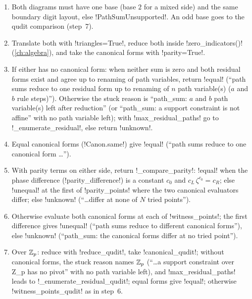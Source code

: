 \begin{algorithm}\label{alg:semantics-compare-pathsums}
\begin{enumerate}
\item Both diagrams must have one base (base $2$ for a mixed side) and the same boundary digit layout, else \py!PathSumUnsupported!. An odd base goes to the qudit comparison (step~7).
\item Translate both with \py!triangles=True!, reduce both inside \py!zero_indicators()! (\cref{ch:algebra}), and take the canonical forms with \py!parity=True!.
\item If either has no canonical form: when neither sum is zero and both residual forms exist and agree up to renaming of path variables, return \code!equal! (``path sums reduce to one residual form up to renaming of $n$ path variable(s) ($a$ and $b$ rule steps)''). Otherwise the stuck reason is ``path\_sum: $a$ and $b$ path variable(s) left after reduction'' (or ``path\_sum: a support constraint is not affine'' with no path variable left); with \py!max_residual_paths! go to \py!_enumerate_residual!, else return \code!unknown!.
\item Equal canonical forms (\py!Canon.same!) give \code!equal! (``path sums reduce to one canonical form \ldots'').
\item With parity terms on either side, return \py!_compare_parity!: \code!equal! when the phase difference (\py!parity_difference!) is a constant $c_0$ and $c_L\,\zeta^{c_0}=c_R$; else \code!unequal! at the first of \py!parity_points! where the two canonical evaluators differ; else \code!unknown! (``\ldots differ at none of $N$ tried points'').
\item Otherwise evaluate both canonical forms at each of \py!witness_points!; the first difference gives \code!unequal! (``path sums reduce to different canonical forms''), else \code!unknown! (``path\_sum: the canonical forms differ at no tried point'').
\item Over $\mathbb{Z}_p$: reduce with \py!reduce_qudit!, take \py!canonical_qudit!; without canonical forms, the stuck reason names $\mathbb{Z}_p$ (``\ldots a support constraint over Z\_p has no pivot'' with no path variable left), and \py!max_residual_paths! leads to \py!_enumerate_residual_qudit!; equal forms give \code!equal!; otherwise \py!witness_points_qudit! as in step~6.
\end{enumerate}
\end{algorithm}

